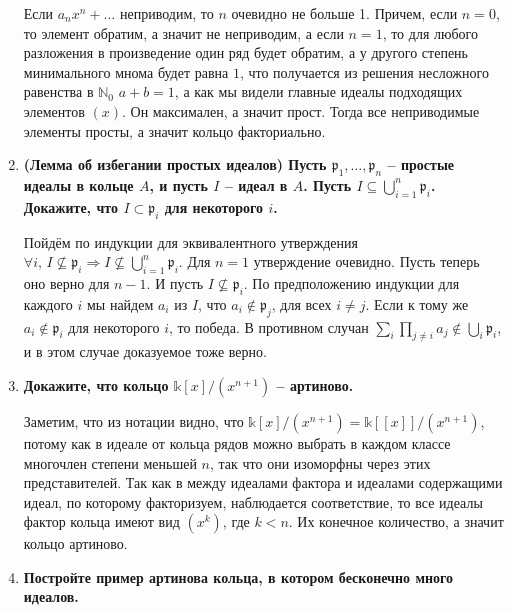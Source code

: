 \documentclass{article}
\begin{document}
\begin{enumerate}
        Если $a_nx^n+\ldots$ неприводим, то $n$ очевидно не больше 1. Причем,
        если $n=0$, то элемент обратим, а значит не неприводим, а если $n=1$, то для
        любого разложения в произведение один ряд будет обратим, а у другого
        степень минимального мнома будет равна $1$, что получается из решения
        несложного равенства в $\mathbb{N}_0$ $a+b=1$, а как мы видели главные
        идеалы подходящих элементов $(x)$. Он максимален, а значит прост.
        Тогда все неприводимые элементы просты, а значит кольцо факториально.

    \item \textbf{(Лемма об избегании простых идеалов) Пусть $\mathfrak{p}_1,
        \ldots,\mathfrak{p}_n$ – простые идеалы в кольце $A$, и пусть $I$ –
        идеал в $A$. Пусть $I\subseteq\bigcup_{i=1}^n\mathfrak{p}_i$. Докажите,
        что $I\subset\mathfrak{p}_i$ для некоторого $i$.}

        Пойдём по индукции для эквивалентного утверждения $\forall i,\,I
        \nsubseteq\mathfrak{p}_i\Rightarrow I\nsubseteq\bigcup_{i=1}^{n}
        \mathfrak{p}_i$. Для $n=1$ утверждение очевидно. Пусть теперь оно
        верно для $n-1$. И пусть $I\nsubseteq\mathfrak{p}_i$.
        По предположению индукции для каждого $i$ мы найдем $a_i$ из $I$, что
        $a_i\notin\mathfrak{p}_j$, для всех $i\neq j$. Если к тому же $a_i\notin
        \mathfrak{p}_i$ для некоторого $i$, то победа. В противном случан $\sum_i\prod_{j\neq i}
        a_j\notin\bigcup_i\mathfrak{p}_i$, и в этом случае доказуемое тоже верно.

    \item \textbf{Докажите, что кольцо $\mathbb{k}[x]/(x^{n+1})$ – артиново.}

        Заметим, что из нотации видно, что $\mathbb{k}[x]/(x^{n+1})=\mathbb{k}
        [[x]]/(x^{n+1})$, потому как в идеале от кольца рядов можно выбрать в
        каждом классе многочлен степени меньшей $n$, так что они изоморфны
        через этих представителей. Так как в между идеалами фактора и идеалами
        содержащими идеал, по которому факторизуем, наблюдается соответствие, то
        все идеалы фактор кольца имеют вид $(x^k)$, где $k<n$. Их конечное
        количество, а значит кольцо артиново.

    \item \textbf{Постройте пример артинова кольца, в котором бесконечно много идеалов.}


\end{enumerate}
\end{document}
